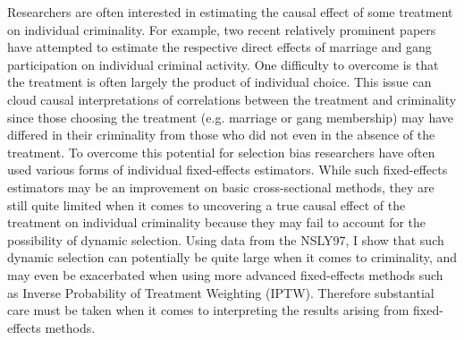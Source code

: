 Researchers are often interested in estimating the causal effect of some treatment on individual criminality. For example, two recent relatively prominent papers have attempted to estimate the respective direct effects of marriage and gang participation on individual criminal activity. One difficulty to overcome is that the treatment is often largely the product of individual choice. This issue can cloud causal interpretations of correlations between the treatment and criminality since those choosing the treatment (e.g. marriage or gang membership) may have differed in their criminality from those who did not even in the absence of the treatment. To overcome this potential for selection bias researchers have often used various forms of individual fixed-effects estimators. While such fixed-effects estimators may be an improvement on basic cross-sectional methods, they are still quite limited when it comes to uncovering a true causal effect of the treatment on individual criminality because they may fail to account for the possibility of dynamic selection. Using data from the NSLY97, I show that such dynamic selection can potentially be quite large when it comes to criminality, and may even be exacerbated when using more advanced fixed-effects methods such as Inverse Probability of Treatment Weighting (IPTW). Therefore substantial care must be taken when it comes to interpreting the results arising from fixed-effects methods.